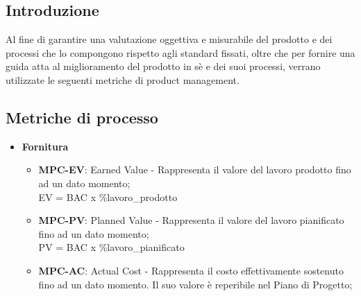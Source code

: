 \subsection{Introduzione}
Al fine di garantire una valutazione oggettiva e misurabile del prodotto e dei processi che lo compongono rispetto agli standard fissati, oltre che per fornire una guida atta al miglioramento del prodotto in sè e dei suoi processi, verrano utilizzate le seguenti metriche di product management. 

\subsection{Metriche di processo}
\begin{itemize}
    \item \textbf{Fornitura}
        \begin{itemize}
            \item \textbf{MPC-EV}: Earned Value - Rappresenta il valore del lavoro prodotto fino ad un dato momento;\\
                EV = BAC x \%lavoro\_prodotto\\  
            \item \textbf{MPC-PV}: Planned Value - Rappresenta il valore del lavoro pianificato fino ad un dato momento;\\
                PV = BAC x \%lavoro\_pianificato\\
            \item \textbf{MPC-AC}: Actual Cost - Rappresenta il costo effettivamente sostenuto fino ad un dato momento. Il suo valore è reperibile nel Piano di Progetto;\\


\end{itemize}
\end{itemize}
